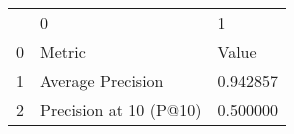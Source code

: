 \begin{tabular}{lll}
 & 0 & 1 \\
0 & Metric & Value \\
1 & Average Precision & 0.942857 \\
2 & Precision at 10 (P@10) & 0.500000 \\
\end{tabular}
